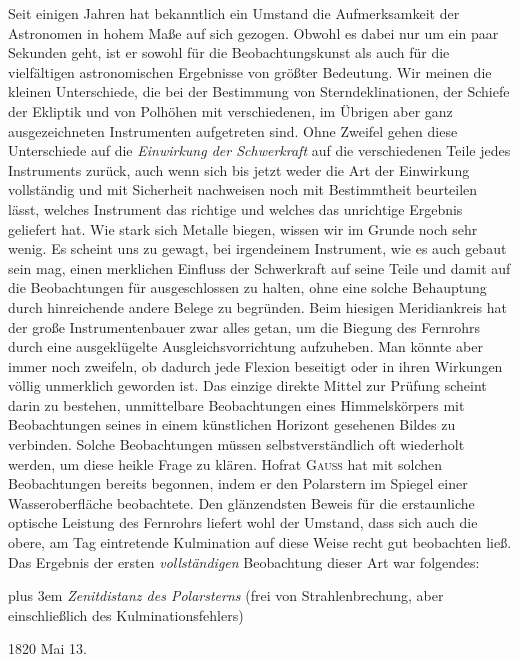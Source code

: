 Seit einigen Jahren hat bekanntlich ein Umstand die Aufmerksamkeit der Astronomen in hohem Maße auf sich gezogen. Obwohl es dabei nur um ein paar Sekunden geht, ist er sowohl für die Beobachtungskunst als auch für die vielfältigen astronomischen Ergebnisse von größter Bedeutung. Wir meinen die kleinen Unterschiede, die bei der Bestimmung von Sterndeklinationen, der Schiefe der Ekliptik und von Polhöhen mit verschiedenen, im Übrigen aber ganz ausgezeichneten Instrumenten aufgetreten sind. Ohne Zweifel gehen diese Unterschiede auf die \emph{Einwirkung der Schwerkraft} auf die verschiedenen Teile jedes Instruments zurück, auch wenn sich bis 
jetzt weder die Art der Einwirkung vollständig und mit Sicherheit nachweisen noch mit Bestimmtheit beurteilen lässt, welches Instrument das richtige und welches das unrichtige Ergebnis geliefert hat. Wie stark sich Metalle biegen, wissen wir im Grunde noch sehr wenig. Es scheint uns zu gewagt, bei irgendeinem Instrument, wie es auch gebaut sein mag, einen merklichen Einfluss der Schwerkraft auf seine Teile und damit auf die Beobachtungen für ausgeschlossen zu halten, ohne eine solche Behauptung durch hinreichende andere Belege zu begründen. Beim hiesigen Meridiankreis hat der große Instrumentenbauer zwar alles getan, um die Biegung des Fernrohrs durch eine ausgeklügelte Ausgleichsvorrichtung aufzuheben. Man könnte aber immer noch zweifeln, ob dadurch jede Flexion beseitigt oder in ihren Wirkungen völlig unmerklich geworden ist. Das einzige direkte Mittel zur Prüfung scheint darin zu bestehen, unmittelbare Beobachtungen eines Himmelskörpers mit Beobachtungen seines in einem künstlichen Horizont gesehenen Bildes zu verbinden. Solche Beobachtungen müssen selbstverständlich oft wiederholt werden, um diese heikle Frage zu klären. Hofrat \textsc{Gauss} hat mit solchen Beobachtungen bereits begonnen, indem er den Polarstern im Spiegel einer Wasseroberfläche beobachtete. Den glänzendsten Beweis für die erstaunliche optische Leistung des Fernrohrs liefert wohl der Umstand, dass sich auch die obere, am Tag eintretende Kulmination auf diese Weise recht gut beobachten ließ. Das Ergebnis der ersten \textit{vollständigen} Beobachtung dieser Art war folgendes:

{\rightskip=0pt plus 3em \textit{Zenitdistanz des Polarsterns} (frei von Strahlenbrechung, aber einschließlich des Kulminationsfehlers)\par}

\begin{center}
1820 Mai 13.
\end{center}

